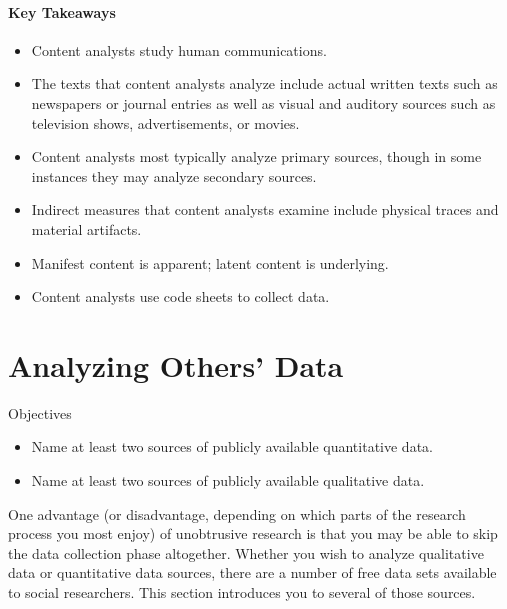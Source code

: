 \paragraph{Key Takeaways}

\begin{itemize}
	\setlength{\itemsep}{0pt}
	\setlength{\parskip}{0pt}
	\setlength{\parsep}{0pt}
	
	\item Content analysts study human communications.
	\item The texts that content analysts analyze include actual written texts such as newspapers or journal entries as well as visual and auditory sources such as television shows, advertisements, or movies.
	\item Content analysts most typically analyze primary sources, though in some instances they may analyze secondary sources.
	\item Indirect measures that content analysts examine include physical traces and material artifacts.
	\item Manifest content is apparent; latent content is underlying.
	\item Content analysts use code sheets to collect data.
	
\end{itemize}

\section{Analyzing Others' Data}

\begin{center}
	\begin{objbox}{Objectives}
		\begin{itemize}
			\setlength{\itemsep}{0pt}
			\setlength{\parskip}{0pt}
			\setlength{\parsep}{0pt}
			
			\item Name at least two sources of publicly available quantitative data.
			\item Name at least two sources of publicly available qualitative data.
			
		\end{itemize}
	\end{objbox}
\end{center}

One advantage (or disadvantage, depending on which parts of the research process you most enjoy) of unobtrusive research is that you may be able to skip the data collection phase altogether. Whether you wish to analyze qualitative data or quantitative data sources, there are a number of free data sets available to social researchers. This section introduces you to several of those sources.

